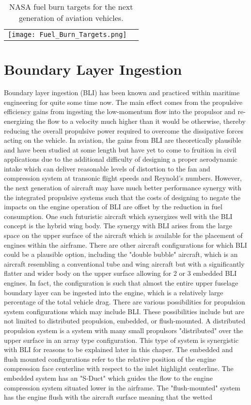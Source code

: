 \begin{table}[ht]
\caption{NASA fuel burn targets for the next generation of aviation vehicles. \cite{Kestner2011}}
\centering
\begin{tabular}{cc}
\texttt{[image: Fuel\_Burn\_Targets.png]}
\end{tabular}
\label{Fuel_Burn_Targets}
\end{table}


\section{Boundary Layer Ingestion}
Boundary layer ingestion (BLI) has been known and practiced within maritime engineering for quite some time now. The main effect comes from the propulsive efficiency gains from ingesting the low-momentum flow into the propulsor and re-energizing the flow to a velocity much higher than it would be otherwise, thereby reducing the overall propulsive power required to overcome the dissipative forces acting on the vehicle. In aviation, the gains from BLI are theoretically plausible and have been studied at some length but have yet to come to fruition in civil applications due to the additional difficulty of designing a proper aerodynamic intake which can deliver reasonable levels of distortion to the fan and compression system at transonic flight speeds and Reynold's numbers. However, the next generation of aircraft may have much better performance synergy with the integrated propulsive systems such that the costs of designing to negate the impacts on the engine operation of BLI are offset by the reduction in fuel consumption. One such futuristic aircraft which synergizes well with the BLI concept is the hybrid wing body. The synergy with BLI arises from the large space on the upper surface of the aircraft which is available for the placement of engines within the airframe. There are other aircraft configurations for which BLI could be a plausible option, including the "double bubble" aircraft, which is an aircraft resembling a conventional tube and wing aircraft but with a significantly flatter and wider body on the upper surface allowing for 2 or 3 embedded BLI engines. In fact, the configuration is such that almost the entire upper fuselage boundary layer can be ingested into the engine, which is a relatively large percentage of the total vehicle drag.  There are various possibilities for propulsion system configurations which may include BLI. These possibilities include but are not limited to distributed propulsion, embedded, or flush-mounted. A distributed propulsion system is a system with many small propulsors "distributed" over the upper surface in an array type configuration.  This type of system is synergistic with BLI for reasons to be explained later in this chaper. The embedded and flush mounted configurations refer to the relative position of the engine compression face centerline with respect to the inlet highlight centerline. The embedded system has an "S-Duct" which guides the flow to the engine compression system situated lower in the airframe. The "flush-mounted" system has the engine flush with the aircraft surface meaning that the wetted 